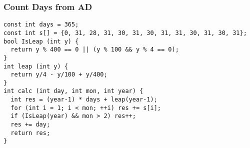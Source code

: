 \documentclass[10pt,landscape]{article}
\begin{document}
\begin{multicols}{2}
\subsubsection{Count Days from AD}
\begin{lstlisting}
const int days = 365;
const int s[] = {0, 31, 28, 31, 30, 31, 30, 31, 31, 30, 31, 30, 31};
bool IsLeap (int y) {
  return y % 400 == 0 || (y % 100 && y % 4 == 0);
}
int leap (int y) {
  return y/4 - y/100 + y/400;
}
int calc (int day, int mon, int year) {
  int res = (year-1) * days + leap(year-1);
  for (int i = 1; i < mon; ++i) res += s[i];
  if (IsLeap(year) && mon > 2) res++;
  res += day;
  return res;
}
\end{lstlisting}

\end{multicols}
\end{document}
